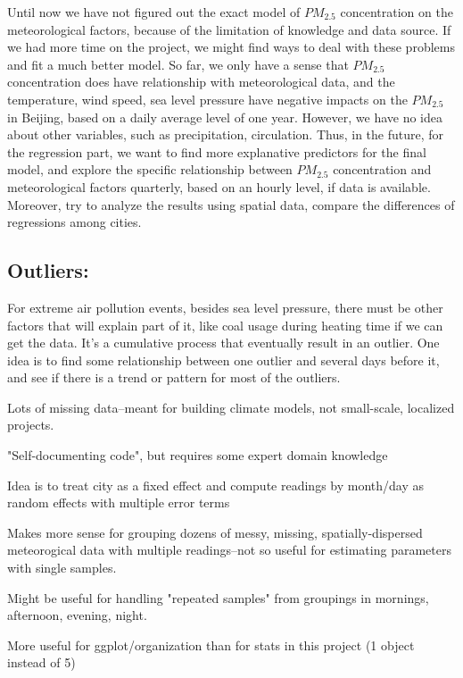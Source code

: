 \documentclass[11pt]{article} %
\begin{document}
Until now we have not figured out the exact model of \(PM_{2.5}\) concentration on the meteorological factors, because of the limitation of knowledge and data source. If we had more time on the project, we might find ways to deal with these problems and fit a much better model. So far, we only have a sense that \(PM_{2.5}\) concentration does have relationship with meteorological data, and the temperature, wind speed, sea level pressure have negative impacts on the \(PM_{2.5}\) in Beijing, based on a daily average level of one year. However, we have no idea about other variables, such as precipitation, circulation. Thus, in the future, for the regression part, we want to find more explanative predictors for the final model, and explore the specific relationship between \(PM_{2.5}\) concentration and meteorological factors quarterly, based on an hourly level, if data is available. Moreover, try to analyze the results using spatial data, compare the differences of regressions among cities.

\subsection{Outliers:} 

For extreme air pollution events, besides sea level pressure, there must be other factors that will explain part of it, like coal usage during heating time if we can get the data. It’s a cumulative process that eventually result in an outlier. One idea is to find some relationship between one outlier and several days before it, and see if there is a trend or pattern for most of the outliers. 

Lots of missing data--meant for building climate models,
not small-scale, localized projects.

"Self-documenting code", but requires some expert domain
knowledge

Idea is to treat city as a fixed effect
and compute readings by month/day as random effects
with multiple error terms

Makes more sense for grouping dozens of 
messy, missing, spatially-dispersed meteorogical
data with multiple readings--not so useful for
estimating parameters with single samples.

Might be useful for handling "repeated samples" from 
groupings in mornings, afternoon, evening, night. 

More useful for ggplot/organization than for stats
in this project (1 object instead of 5)
\end{document}
